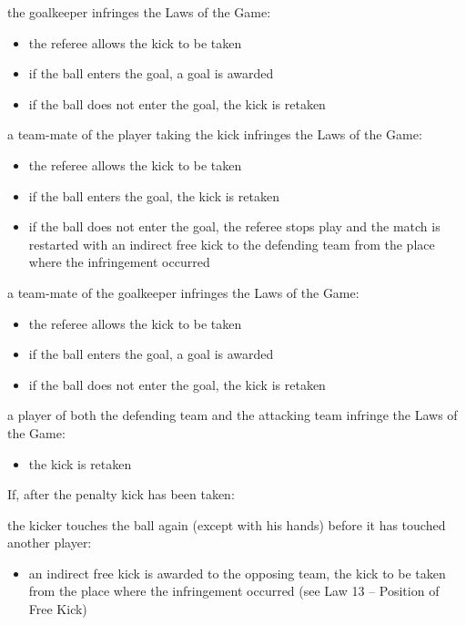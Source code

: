 {the goalkeeper infringes the Laws of the Game:

\begin{itemize}
\item the referee allows the kick to be taken 
\item if the ball enters the goal, a goal is awarded 
\item if the ball does not enter the goal, the kick is retaken 
\end{itemize}

\bigskip

a team-mate of the player taking the kick infringes the Laws of the
Game: 

\begin{itemize}
\item the referee allows the kick to be taken 
\item if the ball enters the goal, the kick is retaken 
\item if the ball does not enter the goal, the referee stops play and the
match is restarted with an indirect free kick to the defending team
from the place where the infringement occurred 
\end{itemize}

\bigskip

a team-mate of the goalkeeper infringes the Laws of the Game: 

\begin{itemize}
\item the referee allows the kick to be taken 
\item if the ball enters the goal, a goal is awarded 
\item if the ball does not enter the goal, the kick is retaken 
\end{itemize}

\bigskip

a player of both the defending team and the attacking team infringe the
Laws of the Game:

\begin{itemize}
\item the kick is retaken
\end{itemize}

\bigskip

If, after the penalty kick has been taken:

the kicker touches the ball again (except with his hands) before it has
touched another player:

\begin{itemize}
\item an indirect free kick is awarded to the opposing team, the kick to be
taken from the place where the infringement occurred (see Law 13 --
Position of Free Kick)
\end{itemize}

}
